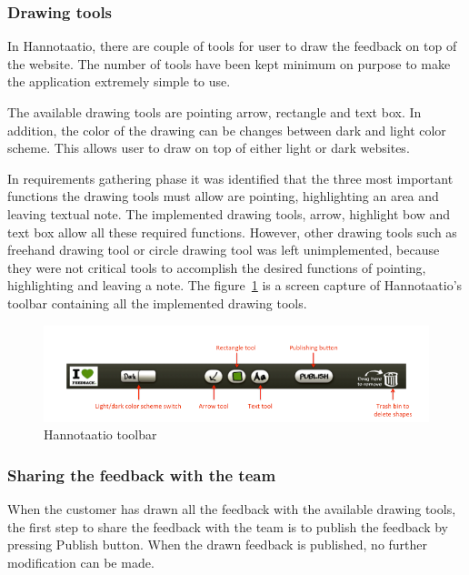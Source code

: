 \documentclass[english,12pt,a4paper,pdftex]{article}
\begin{document}
\subsubsection{Drawing tools}

In Hannotaatio, there are couple of tools for user to draw the feedback on top of the website. The number of tools have been kept minimum on purpose to make the application extremely simple to use.

The available drawing tools are pointing arrow, rectangle and text box. In addition, the color of the drawing can be changes between dark and light color scheme. This allows user to draw on top of either light or dark websites.

In requirements gathering phase it was identified that the three most important functions the drawing tools must allow are pointing, highlighting an area and leaving textual note. The implemented drawing tools, arrow, highlight bow and text box allow all these required functions. However, other drawing tools such as freehand drawing tool or circle drawing tool was left unimplemented, because they were not critical tools to accomplish the desired functions of pointing, highlighting and leaving a note. The figure~\ref{fig:hannotaatio_toolbar} is a screen capture of Hannotaatio's toolbar containing all the implemented drawing tools.

\begin{figure}[htb]
\begin{center}
\includegraphics[width=1.0\textwidth]{drawing_tools_annotated_crop.png}
\end{center}
\caption{Hannotaatio toolbar}
\label{fig:hannotaatio_toolbar}
\end{figure}

\subsubsection{Sharing the feedback with the team}

When the customer has drawn all the feedback with the available drawing tools, the first step to share the feedback with the team is to publish the feedback by pressing Publish button. When the drawn feedback is published, no further modification can be made.
\end{document}
